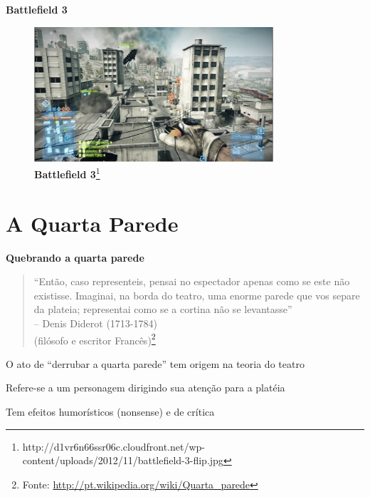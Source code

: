\expandafter\documentclass\expandafter[table, usenames, svgnames, dvipsnames, \classopts]{beamer}
\begin{document}
\begin{frame}{\textbf{Battlefield 3}}
    \centering
    \begin{figure}
        \includegraphics[height=5cm]{tank}
        \caption{\scriptsize\textbf{Battlefield 3}\footnote{http://d1vr6n66ssr06c.cloudfront.net/wp-content/uploads/2012/11/battlefield-3-flip.jpg}}
    \end{figure}
\end{frame}

\section{A Quarta Parede}

\begin{frame}{\textbf{Quebrando a quarta parede}}

	\begin{quotation}
		\noindent
		``Então, caso representeis, pensai no espectador apenas como se este não existisse. Imaginai, na borda do teatro, uma enorme parede que vos separe da plateia; representai como se a cortina não se levantasse''\\
		\hfill -- Denis Diderot (1713-1784)\\
		\hfill (filósofo e escritor Francês)\footnote{Fonte: \url{http://pt.wikipedia.org/wiki/Quarta_parede}}
	\end{quotation}
	
	\vspace{1em}

	\begin{outline}
		\1 O ato de ``derrubar a quarta parede'' tem origem na teoria do teatro
		
		\1 Refere-se a um personagem dirigindo sua atenção para a platéia
			
		\1 Tem efeitos humorísticos (nonsense) e de crítica
	\end{outline}

\end{frame}
\end{document}
